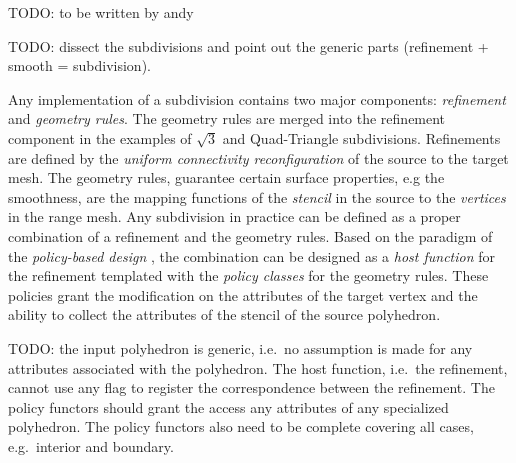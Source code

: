 TODO: to be written by andy

TODO: dissect the subdivisions and point out the generic parts (refinement
+ smooth = subdivision).

Any implementation of a subdivision contains two major
components: \emph{refinement} and \emph{geometry rules}.
The geometry rules are merged into the refinement component
in the examples of $\sqrt{3}$ and Quad-Triangle subdivisions.
Refinements are defined by the 
\emph{uniform connectivity reconfiguration} of the source 
to the target mesh. The geometry rules,
guarantee certain surface properties, e.g the smoothness, are the
mapping functions of the \emph{stencil} in the source to the
\emph{vertices} in the range mesh. Any subdivision in practice can
be defined as a proper combination of a refinement and the
geometry rules. Based on the paradigm of the
\emph{policy-based design} \cite{a-rotm-02}, the combination can be
designed as a \emph{host function} for the refinement
templated with the \emph{policy classes} for the geometry rules.
These policies grant the modification on the attributes of the
target vertex and the ability to collect the attributes of the
stencil of the source polyhedron.

TODO: the input polyhedron is generic, i.e.\ no assumption
is made for any attributes associated with the polyhedron.
The host function, i.e.\ the refinement, cannot use any
flag to register the correspondence between the refinement.
The policy functors should grant the access any attributes
of any specialized polyhedron. The policy functors also
need to be complete covering all cases, e.g.\ interior and
boundary.




